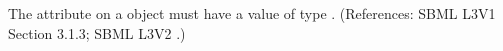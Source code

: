 The attribute  on a \Unit object must have a value of type
.  (References: SBML L3V1 Section 3.1.3; SBML L3V2 .)
